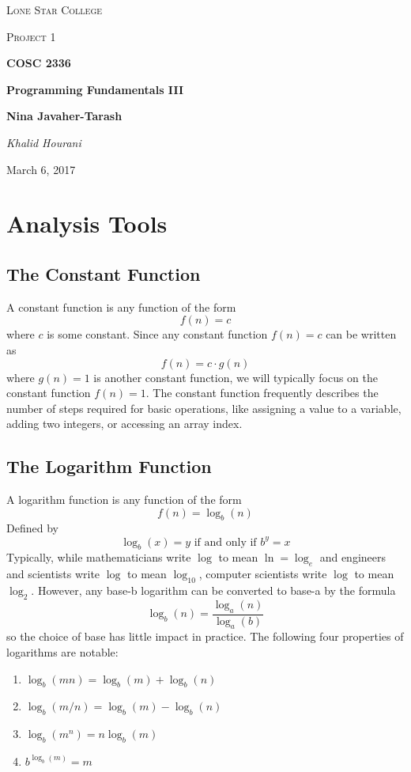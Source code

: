 \documentclass[a4paper]{article}
\begin{document}
\begin{titlepage}
	\centering
	{\scshape\LARGE Lone Star College \par}
	\vspace{1cm}
	{\scshape\Large Project 1\par}
	\vspace{1.5cm}
	{\huge\bfseries COSC 2336 \par}
	{\huge\bfseries Programming Fundamentals III\par}
	\vspace{0.5cm}
	{\large\bfseries Nina Javaher-Tarash\par}
	\vspace{2cm}
	{\Large\itshape Khalid Hourani\par}
	\vspace{0.5cm}
	{\large March 6, 2017\par}
	\vfill

\end{titlepage}
\section{Analysis Tools}
\subsection{The Constant Function}
A constant function is any function of the form \[f(n) = c\] where $c$ is some constant. Since any constant function $f(n) = c$ can be written as \[f(n) = c \cdot g(n)\] where $g(n) = 1$ is another constant function, we will typically focus on the constant function $f(n)=1$. The constant function frequently describes the number of steps required for basic operations, like assigning a value to a variable, adding two integers, or accessing an array index. 

\subsection{The Logarithm Function}

  A logarithm function is any function of the form \[f(n)=\log_b(n)\] Defined by \[\log_b(x)=y\text{ if and only if } b^y=x\] Typically, while mathematicians write $\log$ to mean $\ln=\log_e$ and engineers and scientists write $\log$ to mean $\log_{10}$, computer scientists write $\log$ to mean $\log_2$. However, any base-b logarithm can be converted to base-a by the formula \[\log_b(n)=\frac{\log_a(n)}{\log_a(b)}\] so the choice of base has little impact in practice. The following four properties of logarithms are notable:
  \begin{enumerate}
  \item $\log_b(mn) = \log_b(m)+\log_b(n)$
  \item $\log_b(m/n) = \log_b(m) - \log_b(n)$
  \item $\log_b(m^n) = n\log_b(m)$
  \item $b^{\log_b(m)} = m$
  \end{enumerate}
\end{document}
